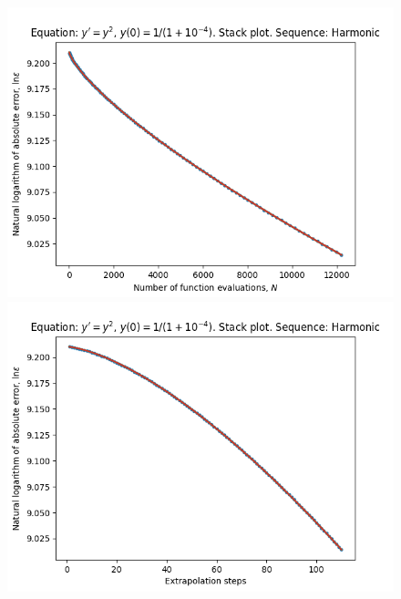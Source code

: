 \begin{figure}[H]
\centering
\begin{minipage}{0.45\textwidth}
\centering
\includegraphics[scale=0.45]{../results/emr_plots/singularity_4_hp_harmonic_stack.png}
\end{minipage}
\begin{minipage}{0.45\textwidth}
\centering
\includegraphics[scale=0.45]{../results/emr_plots/singularity_4_hp_harmonic_steps_stack.png}
\end{minipage}
\end{figure}


